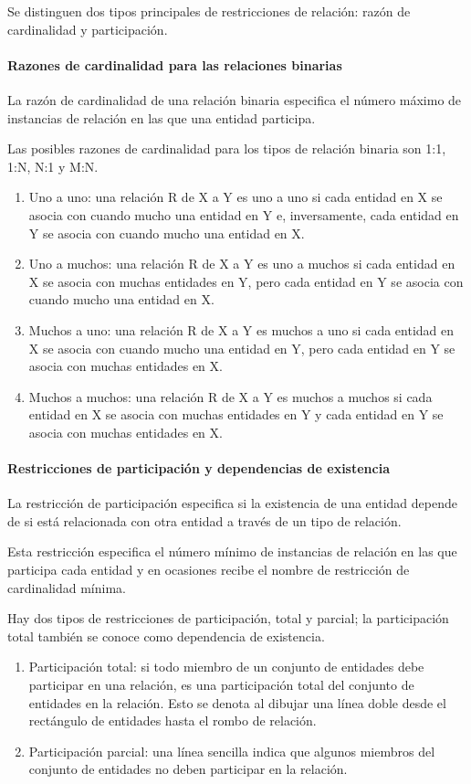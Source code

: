 Se distinguen dos tipos principales de restricciones de relación: razón de cardinalidad y participación.


\paragraph*{Razones de cardinalidad para las relaciones binarias}
La razón de cardinalidad de una relación binaria especifica el número máximo de instancias de relación en las que una entidad participa.


Las posibles razones de cardinalidad para los tipos de relación binaria son 1:1, 1:N, N:1 y M:N.
\begin{enumerate}
    \item Uno a uno: una relación R de X a Y es uno a uno si cada entidad en X se asocia con cuando mucho una entidad en Y e, inversamente, cada entidad en Y se asocia con cuando mucho una entidad en X.
    \item Uno a muchos: una relación R de X a Y es uno a muchos si cada entidad en X se asocia con muchas entidades en Y, pero cada entidad en Y se asocia con cuando mucho una entidad en X. 
    \item Muchos a uno: una relación R de X a Y es muchos a uno si cada entidad en X se asocia con cuando mucho una entidad en Y, pero cada entidad en Y se asocia con muchas entidades en X. 
    \item Muchos a muchos: una relación R de X a Y es muchos a muchos si cada entidad en X se asocia con muchas entidades en Y y cada entidad en Y se asocia con muchas entidades en X. 
\end{enumerate}

\paragraph*{Restricciones de participación y dependencias de existencia}
La restricción de participación especifica si la existencia de una entidad depende de si está relacionada con otra entidad a través de un tipo de relación.


Esta restricción especifica el número mínimo de instancias de relación en las que participa cada entidad y en ocasiones recibe el nombre de restricción de cardinalidad mínima.


Hay dos tipos de restricciones de participación, total y parcial; la participación total también se conoce como dependencia de existencia.

\begin{enumerate}
    \item Participación total: si todo miembro de un conjunto de entidades debe participar en una relación, es una participación total del conjunto de entidades en la relación. Esto se denota al dibujar una línea doble desde el rectángulo de entidades hasta el rombo de relación.
    \item Participación parcial: una línea sencilla indica que algunos miembros del conjunto de entidades no deben participar en la relación.
    \end{enumerate}

